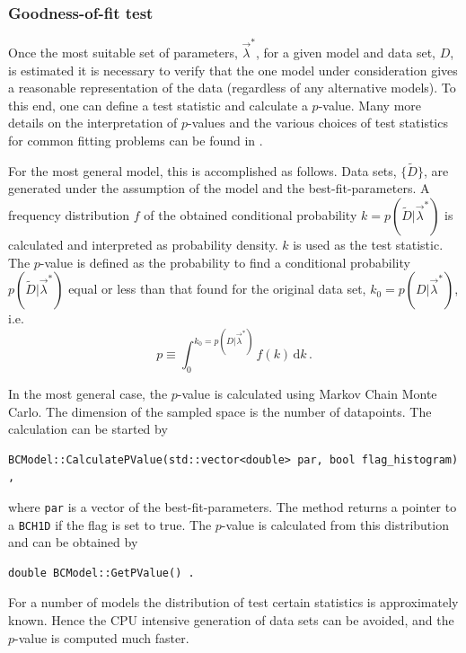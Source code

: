 \documentclass[11pt, a4paper]{article}
\begin{document}

\subsubsection{Goodness-of-fit test}

Once the most suitable set of parameters, $\vec{\lambda}^{*}$, for a
given model and data set, $D$, is estimated it is necessary
to verify that the one  model under consideration
gives a reasonable representation of the data
(regardless of any alternative models). To this end, one can
define a test statistic and calculate a $p$-value. Many more
details on the interpretation of $p$-values and the various
choices of test statistics for common fitting problems can be found
in \cite{BAT_pValue}.

For the most general model, this is accomplished as follows.
Data sets, $\{ \tilde{D} \}$, are generated under the
assumption of the model and the best-fit-parameters. A frequency
distribution $f$ of the obtained conditional probability
$k=p(\tilde{D}|\vec{\lambda}^{*})$ is calculated and interpreted as
probability density. $k$ is used as the test statistic.
The $p$-value is defined as the probability to
find a conditional probability $p(\tilde{D}|\vec{\lambda}^{*})$ equal
or less than that found for the original data set,
$k_{0}=p(D|\vec{\lambda}^{*})$, i.e.
%
\begin{equation}
p \equiv  \int_{0}^{k_{0}=p(D|\vec{\lambda}^{*})} f(k) \, \mathrm{d}k \, .
\end{equation}

\noindent
In the most general case, the $p$-value is calculated using Markov
Chain Monte Carlo. The dimension of the sampled space is the number
of datapoints.
 The calculation can be started by
%
\begin{verbatim}
BCModel::CalculatePValue(std::vector<double> par, bool flag_histogram) ,
\end{verbatim}
%
\noindent
where \verb|par| is a vector of the best-fit-parameters. The method
returns a pointer to a \verb|BCH1D| if the flag is set to true. The
$p$-value is calculated from this distribution and can be obtained by
%
\begin{verbatim}
double BCModel::GetPValue() .
\end{verbatim}

\noindent
For a number of models the distribution of test certain statistics is
approximately known. Hence the CPU intensive generation of data sets
can be avoided, and the $p$-value is computed much faster. \\
\end{document}
